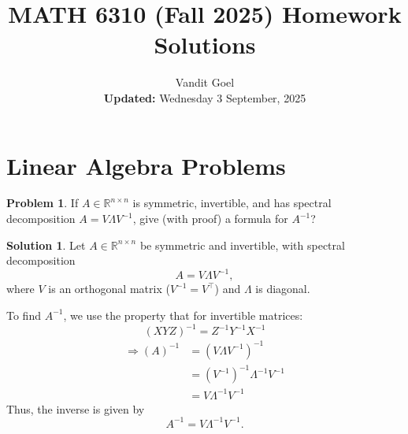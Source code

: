 \documentclass{amsart}[11pt]
\title{MATH 6310 (Fall 2025) Homework Solutions}
\author{Vandit Goel\\\textbf{Updated:} Wednesday  3 September, 2025}
\theoremstyle{definition}
\newtheorem{problem}{Problem}
\newtheorem{solution}{Solution}
\newcommand{\R}{\mathbb{R}}
\begin{document}
\maketitle

\section{Linear Algebra Problems}

\begin{problem}
If $A\in\R^{n\times n}$ is symmetric, invertible, and has spectral decomposition $A=V\Lambda V^{-1}$, give (with proof) a formula for $A^{-1}$?

\begin{solution}
Let $A \in \mathbb{R}^{n \times n}$ be symmetric and invertible, with spectral decomposition
\[
A = V \Lambda V^{-1},
\]
where $V$ is an orthogonal matrix ($V^{-1} = V^\top$) and $\Lambda$ is diagonal.

\vspace{\baselineskip}
\noindent To find $A^{-1}$, we use the property that for invertible matrices:
\[
(XYZ)^{-1} = Z^{-1} Y^{-1} X^{-1}
\]
\begin{align*}
	\Rightarrow(A)^{-1} &= (V \Lambda V^{-1})^{-1} \\
	&= (V^{-1})^{-1}\Lambda^{-1} V^{-1} \\
	&= V\Lambda^{-1} V^{-1}
\end{align*}
Thus, the inverse is given by
\[
A^{-1} = V \Lambda^{-1} V^{-1}.
\]
\end{solution}
\end{problem}
\end{document}
